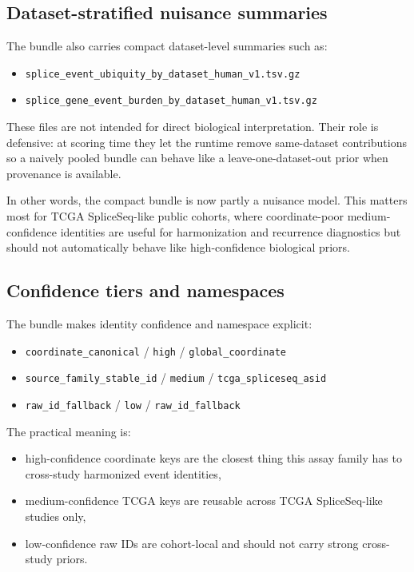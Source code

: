 \documentclass[11pt]{article}
\begin{document}
\subsection{Dataset-stratified nuisance summaries}
The bundle also carries compact dataset-level summaries such as:
\begin{itemize}[leftmargin=2em]
\item \texttt{splice\_event\_ubiquity\_by\_dataset\_human\_v1.tsv.gz}
\item \texttt{splice\_gene\_event\_burden\_by\_dataset\_human\_v1.tsv.gz}
\end{itemize}

These files are not intended for direct biological interpretation. Their role is defensive: at scoring time they let the runtime remove same-dataset contributions so a naively pooled bundle can behave like a leave-one-dataset-out prior when provenance is available.

In other words, the compact bundle is now partly a nuisance model. This matters most for TCGA SpliceSeq-like public cohorts, where coordinate-poor medium-confidence identities are useful for harmonization and recurrence diagnostics but should not automatically behave like high-confidence biological priors.

\subsection{Confidence tiers and namespaces}
The bundle makes identity confidence and namespace explicit:
\begin{itemize}[leftmargin=2em]
\item \texttt{coordinate\_canonical} / \texttt{high} / \texttt{global\_coordinate}
\item \texttt{source\_family\_stable\_id} / \texttt{medium} / \texttt{tcga\_spliceseq\_asid}
\item \texttt{raw\_id\_fallback} / \texttt{low} / \texttt{raw\_id\_fallback}
\end{itemize}

The practical meaning is:
\begin{itemize}[leftmargin=2em]
\item high-confidence coordinate keys are the closest thing this assay family has to cross-study harmonized event identities,
\item medium-confidence TCGA keys are reusable across TCGA SpliceSeq-like studies only,
\item low-confidence raw IDs are cohort-local and should not carry strong cross-study priors.
\end{itemize}
\end{document}
